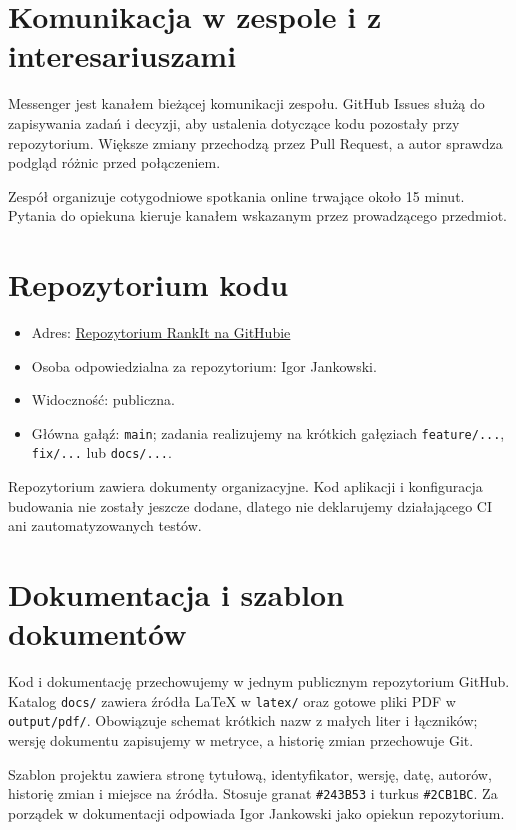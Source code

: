 \documentclass[11pt,a4paper]{article}
\begin{document}
\section{Komunikacja w zespole i z interesariuszami}
Messenger jest kanałem bieżącej komunikacji zespołu. GitHub Issues służą do zapisywania zadań i decyzji, aby ustalenia dotyczące kodu pozostały przy repozytorium. Większe zmiany przechodzą przez Pull Request, a autor sprawdza podgląd różnic przed połączeniem.

Zespół organizuje cotygodniowe spotkania online trwające około 15 minut. Pytania do opiekuna kieruje kanałem wskazanym przez prowadzącego przedmiot.

\section{Repozytorium kodu}
\begin{itemize}
  \item Adres: \href{https://github.com/elprofesoriqo/rpi}{Repozytorium RankIt na GitHubie}
  \item Osoba odpowiedzialna za repozytorium: Igor Jankowski.
  \item Widoczność: publiczna.
  \item Główna gałąź: \texttt{main}; zadania realizujemy na krótkich gałęziach \texttt{feature/...}, \texttt{fix/...} lub \texttt{docs/...}.
\end{itemize}

Repozytorium zawiera dokumenty organizacyjne. Kod aplikacji i konfiguracja budowania nie zostały jeszcze dodane, dlatego nie deklarujemy działającego CI ani zautomatyzowanych testów.

\section{Dokumentacja i szablon dokumentów}
Kod i dokumentację przechowujemy w jednym publicznym repozytorium GitHub. Katalog \texttt{docs/} zawiera źródła LaTeX w \texttt{latex/} oraz gotowe pliki PDF w \texttt{output/pdf/}. Obowiązuje schemat krótkich nazw z małych liter i łączników; wersję dokumentu zapisujemy w metryce, a historię zmian przechowuje Git.

Szablon projektu zawiera stronę tytułową, identyfikator, wersję, datę, autorów, historię zmian i miejsce na źródła. Stosuje granat \texttt{\#243B53} i turkus \texttt{\#2CB1BC}. Za porządek w dokumentacji odpowiada Igor Jankowski jako opiekun repozytorium.
\end{document}
